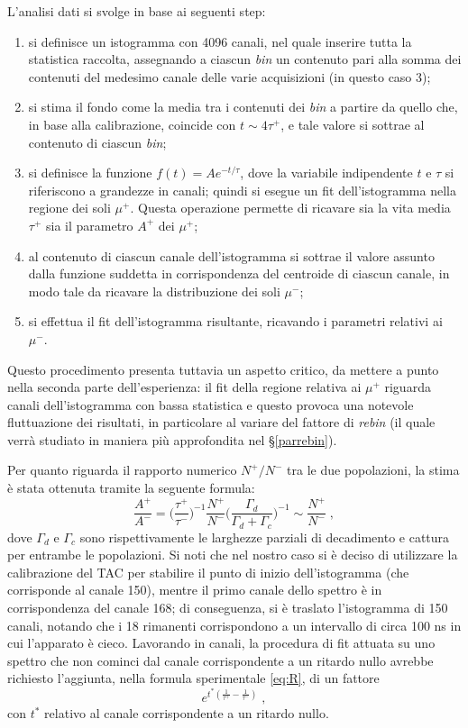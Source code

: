 \documentclass[10pt, oneside, a4paper]{article}   	%
\begin{document}
L'analisi dati si svolge in base ai seguenti step:
\begin{enumerate}
	\item si definisce un istogramma con 4096 canali, nel quale inserire tutta la statistica raccolta, assegnando a ciascun \emph{bin} un contenuto pari alla somma dei contenuti del medesimo canale delle varie acquisizioni (in questo caso 3);
	\item si stima il fondo come la media tra i contenuti dei \emph{bin} a partire da quello che, in base alla calibrazione, coincide con $t\sim 4\tau^+$, e tale valore si sottrae al contenuto di ciascun \emph{bin};
	\item si definisce la funzione $f(t)=Ae^{-t/\tau}$, dove la variabile indipendente $t$ e $\tau$ si riferiscono a grandezze in canali; quindi si esegue un fit dell'istogramma nella regione dei soli $\mu^+$. Questa operazione permette di ricavare sia la vita media $\tau^+$ sia il parametro $A^+$ dei $\mu^+$; 
	\item al contenuto di ciascun canale dell'istogramma si sottrae il valore assunto dalla funzione suddetta in corrispondenza del centroide di ciascun canale, in modo tale da ricavare la distribuzione dei soli $\mu^-$;
	\item si effettua il fit dell'istogramma risultante, ricavando i parametri relativi ai $\mu^-$.
\end{enumerate}
Questo procedimento presenta tuttavia un aspetto critico, da mettere a punto nella seconda parte dell'esperienza: il fit della regione relativa ai $\mu^+$ riguarda canali dell'istogramma con bassa statistica e questo provoca una notevole fluttuazione dei risultati, in particolare al variare del fattore di \emph{rebin} (il quale verrà studiato in maniera più approfondita nel \S\ref{parrebin}).

Per quanto riguarda il rapporto numerico $N^+/N^-$ tra le due popolazioni, la stima è stata ottenuta tramite la seguente formula: 
\begin{equation}
\frac{A^+}{A^-}= \bigg ( \frac{\tau^+}{\tau^-} \bigg )  ^{-1} \frac{N^+}{N^-} \bigg ( \frac{\Gamma_d}{\Gamma_d+\Gamma_c} \bigg )^{-1}\sim\frac{N^+}{N^-}\;,
\label{eq:R}%
\end{equation}
dove $\Gamma_d$ e $\Gamma_c$ sono rispettivamente le larghezze parziali di decadimento e cattura per entrambe le popolazioni. 
Si noti che nel nostro caso si è deciso di utilizzare la calibrazione del TAC per stabilire il punto di inizio dell'istogramma (che corrisponde al canale 150), mentre il primo canale dello spettro è in corrispondenza del canale 168; di conseguenza, si è traslato l'istogramma di 150 canali, notando che i 18  rimanenti corrispondono a un intervallo di circa 100 ns in cui l'apparato è cieco.
Lavorando in canali, la procedura di fit attuata su uno spettro che non cominci dal canale corrispondente a un ritardo nullo avrebbe richiesto l'aggiunta, nella formula sperimentale \ref{eq:R}, di un fattore
\[e^{t^*\left(\frac{1}{\tau^+}-\frac{1}{\tau^-}\right)}\;,\]
con $t^*$ relativo  al canale corrispondente a un ritardo nullo.
\end{document}
